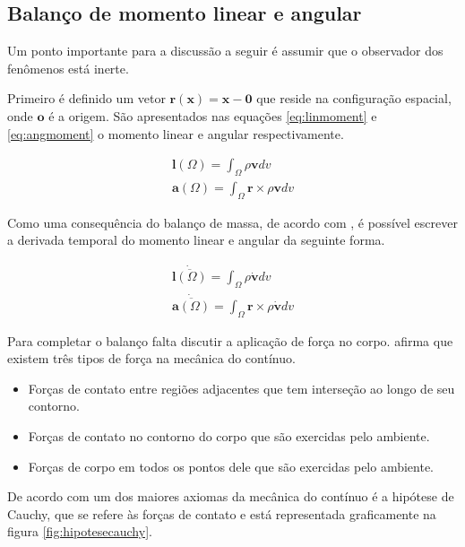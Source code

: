 \subsection{Balanço de momento linear e angular}

Um ponto importante para a discussão a seguir é assumir que o observador dos fenômenos está inerte. \par

Primeiro é definido um vetor $ \boldsymbol{r(x) = x - 0} $ que reside na configuração espacial, onde $ \boldsymbol{o} $ é a origem. São apresentados nas equações \ref{eq:linmoment} e \ref{eq:angmoment} o momento linear e angular respectivamente.

\begin{align}
    \boldsymbol{l}(\Omega) = \int_{\Omega} \rho \boldsymbol{v} dv \label{eq:linmoment} \\
    \boldsymbol{a}(\Omega) = \int_{\Omega} \boldsymbol{r} \times \rho \boldsymbol{v} dv \label{eq:angmoment}
\end{align}

Como uma consequência do balanço de massa, de acordo com \cite{gurtin_fried_anand_2013}, é possível escrever a derivada temporal do momento linear e angular da seguinte forma.

\begin{align}
   \dot{\overline{\boldsymbol{l}(\Omega)}} = \int_{\Omega} \rho \dot{\boldsymbol{v}} dv \label{eq:linmoment} \\
   \dot{\overline{\boldsymbol{a}(\Omega)}} = \int_{\Omega} \boldsymbol{r} \times \rho \dot{\boldsymbol{v}} dv \label{eq:angmoment}
\end{align}

Para completar o balanço falta discutir a aplicação de força no corpo. \cite{gurtin_fried_anand_2013} afirma que existem três tipos de força na mecânica do contínuo. 
\begin{itemize}
    \item Forças de contato entre regiões adjacentes que tem interseção ao longo de seu contorno.
    \item Forças de contato no contorno do corpo que são exercidas pelo ambiente.
    \item Forças de corpo em todos os pontos dele que são exercidas pelo ambiente.
\end{itemize}
De acordo com \cite{gurtin_fried_anand_2013} um dos maiores axiomas da mecânica do contínuo é a hipótese de Cauchy, que se refere às forças de contato e está representada graficamente na figura \ref{fig:hipotesecauchy}. 

